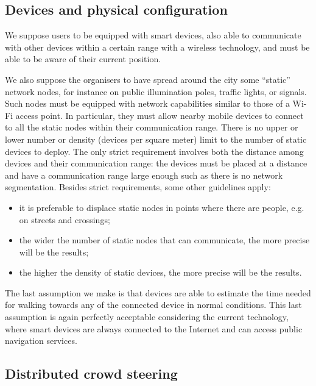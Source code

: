 \documentclass[12pt,a4paper,twoside,openright]{book}
\begin{document}
\subsection{Devices and physical configuration}

We suppose users to be equipped with smart devices, also able to communicate with other devices within a certain range with a wireless technology, and must be able to be aware of their current position.

We also suppose the organisers to have spread around the city some ``static'' network nodes, for instance on public illumination poles, traffic lights, or signals.
%
Such nodes must be equipped with network capabilities similar to those of a Wi-Fi access point.
%
In particular, they must allow nearby mobile devices to connect to all the static nodes within their communication range.
%
There is no upper or lower number or density (devices per square meter) limit to the number of static devices to deploy.
%
The only strict requirement involves both the distance among devices and their communication range: the devices must be placed at a distance and have a communication range large enough such as there is no network segmentation.
%
Besides strict requirements, some other guidelines apply:
\begin{itemize}
 \item it is preferable to displace static nodes in points where there are people, e.g. on streets and crossings;
 \item the wider the number of static nodes that can communicate, the more precise will be the results;
 \item the higher the density of static devices, the more precise will be the results.
\end{itemize}

The last assumption we make is that devices are able to estimate the time needed for walking towards any of the connected device in normal conditions.
%
This last assumption is again perfectly acceptable considering the current technology, where smart devices are always connected to the Internet and can access public navigation services.

\subsection{Distributed crowd steering}
\end{document}
